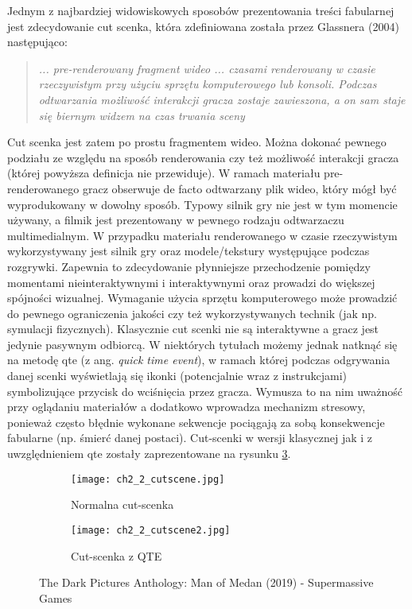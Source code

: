 Jednym z najbardziej widowiskowych sposobów prezentowania treści fabularnej jest zdecydowanie
cut scenka, która zdefiniowana została przez Glassnera (2004) następująco:

\begin{quotation}
    \textit{... pre-renderowany fragment wideo ... czasami renderowany w czasie rzeczywistym przy
        użyciu sprzętu komputerowego lub konsoli. Podczas odtwarzania możliwość interakcji gracza
        zostaje zawieszona, a on sam staje się biernym widzem na czas trwania sceny}\cite{narrative_structures}
\end{quotation}

Cut scenka jest zatem po prostu fragmentem wideo. Można dokonać pewnego podziału ze względu na
sposób renderowania czy też możliwość interakcji gracza (której powyższa definicja nie przewiduje).
W ramach materiału pre-renderowanego gracz obserwuje de facto odtwarzany plik wideo, który mógł
być wyprodukowany w dowolny sposób. Typowy silnik gry nie jest w tym momencie używany, a filmik
jest prezentowany w pewnego rodzaju odtwarzaczu multimedialnym. W przypadku materiału renderowanego
w czasie rzeczywistym wykorzystywany jest silnik gry oraz modele/tekstury występujące podczas
rozgrywki. Zapewnia to zdecydowanie płynniejsze przechodzenie pomiędzy momentami nieinteraktywnymi
i interaktywnymi oraz prowadzi do większej spójności wizualnej. Wymaganie użycia sprzętu komputerowego
może prowadzić do pewnego ograniczenia jakości czy też wykorzystywanych technik (jak np. symulacji
fizycznych). Klasycznie cut scenki nie są interaktywne a gracz jest jedynie pasywnym odbiorcą.
W niektórych tytułach możemy jednak natknąć się na metodę \gls{qte} (z ang. \textit{quick time event}), w
ramach której podczas odgrywania danej scenki wyświetlają się ikonki (potencjalnie wraz z instrukcjami)
symbolizujące przycisk do wciśnięcia przez gracza. Wymusza to na nim uważność przy oglądaniu materiałów
a dodatkowo wprowadza mechanizm stresowy, ponieważ często błędnie wykonane sekwencje pociągają
za sobą konsekwencje fabularne (np. śmierć danej postaci). Cut-scenki w wersji klasycznej jak i z
uwzględnieniem \gls{qte} zostały zaprezentowane na rysunku \ref{fig:ch1_2_2_cutscene}.

\begin{figure}[h]
    \begin{subfigure}{0.49\textwidth}
        \texttt{[image: ch2\_2\_cutscene.jpg]}
        \caption{Normalna cut-scenka}
        \label{subfig:ch2_2_cutscene1}
    \end{subfigure}
    \begin{subfigure}{0.49\textwidth}
        \texttt{[image: ch2\_2\_cutscene2.jpg]}
        \caption{Cut-scenka z QTE}
        \label{subfig:ch2_2_cutscene2}
    \end{subfigure}
    \caption{The Dark Pictures Anthology: Man of Medan (2019) - Supermassive Games}
    \label{fig:ch1_2_2_cutscene}
\end{figure}

